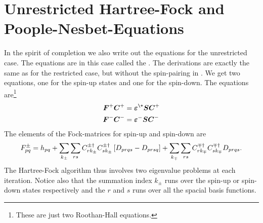 \section{Unrestricted Hartree-Fock and Poople-Nesbet-Equations\label{sec:UHFPNE}}
    In the spirit of completion we also write out the equations for the
    unrestricted case. The equations are in this case called the
    . The derivations are exactly the same as
    for the restricted case, but without the spin-pairing in
    . We get two equations, one for the spin-up states
    and one for the spin-down\cite{compphysThijssen}. The equations
    are\footnote{These are just two Roothan-Hall equations.}
        \begin{equation}
            \begin{aligned}
                \blds{F}^{+}\blds{C}^{+} &=
                \blds{\veps}^{\+}\blds{S}\blds{C}^{+} \\
                \blds{F}^{-}\blds{C}^{-} &=
                \blds{\veps}^{-}\blds{S}\blds{C}^{-}
            \end{aligned}
        \end{equation}
    The elements of the Fock-matrices for spin-up and spin-down are
        \begin{equation}
            F^{\pm}_{pq} = h_{pq} + \sum\limits_{k_{\pm}}\sum\limits_{rs}
            C^{\pm\dagger}_{rk_{\pm}} C^{\pm\dagger}_{sk_{\pm}} \left[D_{prqs}
            - D_{prsq}\right] + \sum\limits_{k_{\mp}}\sum\limits_{rs}
            C^{\mp\dagger}_{rk_{\mp}} C^{\mp\dagger}_{sk_{\mp}} D_{prqs}.
            \label{eq:UHFFockdef}
        \end{equation}
    The Hartree-Fock algorithm thus involves two eigenvalue problems at each
    iteration. Notice also that the summation index $k_{\pm}$ runs over the
    spin-up or spin-down states respectively and the $r$ and $s$ runs over all
    the spacial basis functions.

